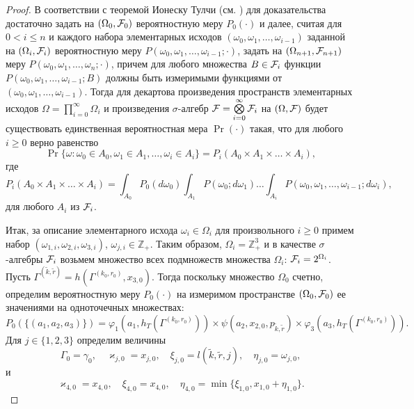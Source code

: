 \documentclass[a4paper,12pt,russian]{extarticle}
\newcommand{\ga}[1]{\Gamma^{\left( #1 \right)} }
\begin{document}
\begin{proof}
В соответствии с теоремой Ионеску Тулчи (см. \cite{Shiryaev}) для доказательства достаточно задать на $(\Omega_0, {\cal F}_0)$ вероятностную меру $P_0(\cdot)$ и далее, считая для $0 < i \leqslant n$ и каждого набора элементарных исходов $(\omega_0, \omega_1, \ldots, \omega_{i-1})$ заданной на $(\Omega_i, {\cal F}_i)$ вероятностную меру $P(\omega_0,\omega_1,\ldots, \omega_{i-1};\cdot)$, задать на $(\Omega_{n+1}, {\cal F}_{n+1})$ меру $P(\omega_0,\omega_1,\ldots, \omega_{n};\cdot)$, причем для любого множества $B\in {\cal F}_i$ функции $P(\omega_0,\omega_1,\ldots, \omega_{i-1};B)$
должны быть измеримыми функциями от $(\omega_0, \omega_1, \ldots, \omega_{i-1})$. Тогда для декартова произведения пространств элементарных исходов $\Omega=\prod\limits_{i=0}^{\infty}\Omega_i$ и произведения $\sigma$-алгебр ${\cal F}=\bigotimes\limits_{i=0}^{\infty} {\cal F}_i$ на $(\Omega,{\cal F})$ будет существовать единственная вероятностная мера $\Pr(\cdot)$ такая, что для любого $i \geqslant 0$ верно равенство
\begin{equation}
\Pr\{\omega \colon \omega_0 \in A_0, \omega_1 \in A_1, \ldots, \omega_i\in A_i\} = P_i(A_0 \times A_1 \times \ldots \times A_i),
\label{ProbabilitiesGeneral}
\end{equation}
где 
\begin{equation}
 P_i(A_0 \times A_1 \times \ldots \times A_i) = \int_{A_0} P_0(d \omega_0) \int_{A_1} P(\omega_0;d \omega_1) \ldots \int_{A_i} P(\omega_0, \omega_1, \ldots, \omega_{i-1}; d \omega_i),
\label{ProbabilitiesGeneralOne}
\end{equation}
для любого $A_i$ из ${\cal F}_i$. 

Итак, за описание элементарного исхода $\omega_i \in \Omega_i$ для произвольного $i \geqslant 0$ примем набор $(\omega_{1,i},\omega_{2,i},\omega_{3,i})$, $\omega_{j,i}\in \mathbb{Z}_+$. Таким образом, $\Omega_i=\mathbb{Z}_+^3$ и в качестве $\sigma$-алгебры ${\cal F}_i$ возьмем множество всех подмножеств множества $\Omega_i$: ${\cal F}_i=2^{\Omega_i}$. Пусть $\ga{\tilde{k},\tilde{r}}=h(\ga{k_0,r_0},x_{3,0})$. Тогда  поскольку множество $\Omega_0$ счетно, определим вероятностную меру $P_0(\cdot)$ на измеримом пространстве $(\Omega_0,{\cal F}_0)$ ее значениями на одноточечных множествах:
\begin{equation}
P_0(\{(a_1,a_2,a_3)\})=\varphi_1(a_1,h_T(\ga{k_0,r_0})) \times \psi(a_2,x_{2,0}, p_{\tilde{k},\tilde{r}}) \times \varphi_3(a_3,h_T(\ga{k_0,r_0})).
\label{probabilitiesOne}
\end{equation}
Для $j\in \{1,2,3\}$ определим величины
\begin{equation}
\Gamma_0=\gamma_0, \quad \varkappa_{j,0}=x_{j,0}, \quad \xi_{j,0}=l(\tilde{k},\tilde{r},j), \quad \eta_{j,0}=\omega_{j,0},
\label{startRekOne}
\end{equation}
и
\begin{equation}
 \varkappa_{4,0}=x_{4,0}, \quad \xi_{4,0}=x_{4,0}, \quad \eta_{4,0}=\min\{\xi_{1,0}, x_{1,0}+\eta_{1,0}\}.
\label{startRekTwo}
\end{equation}


\end{proof}
\end{document}
